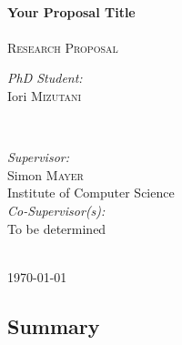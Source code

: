 \documentclass[a4paper,11pt]{article}
\begin{document}
\begin{titlepage}
\HRule \\[0.6cm]
{ \huge \bfseries Your Proposal Title}\\[0.4cm] 
\HRule \\[0.4cm]

\textsc{\Large Research Proposal}

 
\vspace*{\fill}

\begin{minipage}{0.4\textwidth}
\begin{flushleft} \large
\emph{PhD Student:}\\
Iori \textsc{Mizutani} \\ 
\end{flushleft}
\end{minipage}
~
\begin{minipage}{0.5\textwidth}
\begin{flushright} \large
\emph{Supervisor:} \\
Simon \textsc{Mayer} \\
Institute of Computer Science\\[0.5cm]
\emph{Co-Supervisor(s):} \\
To be determined
\end{flushright}
\end{minipage}\\[2cm]


{\large \today}

\vfill %

\end{titlepage}

\subsection*{Summary}

\lipsum

\newpage









\end{document}
